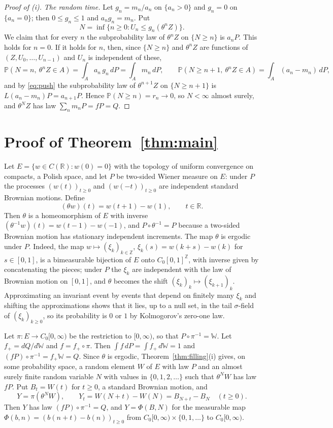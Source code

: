 \documentclass[11pt]{amsart}
\theoremstyle{remark}
\numberwithin{equation}{section}
\newcommand{\Pp}{\mathbb P}
\newcommand{\Z}{\mathbb Z}
\newcommand{\R}{\mathbb R}
\newcommand{\Wi}{\mathbb W}
\begin{document}
\begin{proof}[Proof of \textup{(i)}]
\emph{The random time.} Let $g_n=m_n/a_n$ on $\{a_n>0\}$ and $g_n=0$ on $\{a_n=0\}$; then $0\le g_n\le1$ and $a_ng_n=m_n$. Put
\[
N=\inf\{n\ge0:U_n\le g_n(\theta^nZ)\}.
\]
We claim that for every $n$ the subprobability law of $\theta^nZ$ on $\{N\ge n\}$ is $a_nP$. This holds for $n=0$. If it holds for $n$, then, since $\{N\ge n\}$ and $\theta^nZ$ are functions of $(Z,U_0,\dots,U_{n-1})$ and $U_n$ is independent of these,
\[
\Pp(N=n,\ \theta^nZ\in A)=\int_A a_n\,g_n\,dP=\int_A m_n\,dP,\qquad \Pp(N\ge n+1,\ \theta^nZ\in A)=\int_A(a_n-m_n)\,dP ,
\]
and by \eqref{eq:push} the subprobability law of $\theta^{n+1}Z$ on $\{N\ge n+1\}$ is $L(a_n-m_n)P=a_{n+1}P$. Hence $\Pp(N\ge n)=r_n\to0$, so $N<\infty$ almost surely, and $\theta^NZ$ has law $\sum_nm_nP=fP=Q$.
\end{proof}

\section{Proof of Theorem~\ref{thm:main}}\label{sec:proof}

Let $E=\{w\in C(\R):w(0)=0\}$ with the topology of uniform convergence on compacts, a Polish space, and let $P$ be two-sided Wiener measure on $E$: under $P$ the processes $(w(t))_{t\ge0}$ and $(w(-t))_{t\ge0}$ are independent standard Brownian motions. Define
\[
(\theta w)(t)=w(t+1)-w(1),\qquad t\in\R .
\]
Then $\theta$ is a homeomorphism of $E$ with inverse $(\theta^{-1}w)(t)=w(t-1)-w(-1)$, and $P\circ\theta^{-1}=P$ because a two-sided Brownian motion has stationary independent increments. The map $\theta$ is ergodic under $P$. Indeed, the map $w\mapsto(\xi_k)_{k\in\Z}$, $\xi_k(s)=w(k+s)-w(k)$ for $s\in[0,1]$, is a bimeasurable bijection of $E$ onto $C_0[0,1]^{\Z}$, with inverse given by concatenating the pieces; under $P$ the $\xi_k$ are independent with the law of Brownian motion on $[0,1]$, and $\theta$ becomes the shift $(\xi_k)_k\mapsto(\xi_{k+1})_k$. Approximating an invariant event by events that depend on finitely many $\xi_k$ and shifting the approximations shows that it lies, up to a null set, in the tail $\sigma$-field of $(\xi_k)_{k\ge0}$, so its probability is $0$ or $1$ by Kolmogorov's zero-one law.

Let $\pi:E\to C_0[0,\infty)$ be the restriction to $[0,\infty)$, so that $P\circ\pi^{-1}=\Wi$. Let $f_+=dQ/d\Wi$ and $f=f_+\circ\pi$. Then $\int f\,dP=\int f_+\,d\Wi=1$ and $(fP)\circ\pi^{-1}=f_+\Wi=Q$. Since $\theta$ is ergodic, Theorem~\ref{thm:filling}(i) gives, on some probability space, a random element $W$ of $E$ with law $P$ and an almost surely finite random variable $N$ with values in $\{0,1,2,\dots\}$ such that $\theta^NW$ has law $fP$. Put $B_t=W(t)$ for $t\ge0$, a standard Brownian motion, and
\[
Y=\pi(\theta^NW),\qquad Y_t=W(N+t)-W(N)=B_{N+t}-B_N\quad(t\ge0).
\]
Then $Y$ has law $(fP)\circ\pi^{-1}=Q$, and $Y=\Phi(B,N)$ for the measurable map $\Phi(b,n)=(b(n+t)-b(n))_{t\ge0}$ from $C_0[0,\infty)\times\{0,1,\dots\}$ to $C_0[0,\infty)$.
\end{document}
